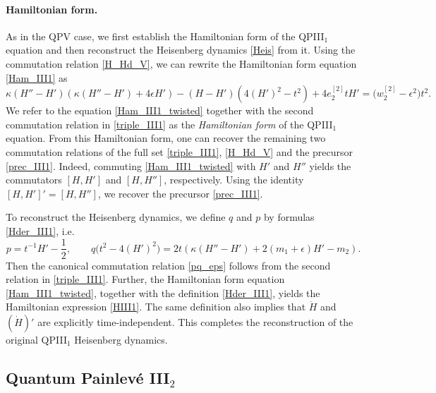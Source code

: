 \documentclass[12pt,a4paper]{article}
\numberwithin{equation}{section}
\begin{document}
\paragraph{Hamiltonian form.}
As in the QPV case, we first establish the Hamiltonian form of the QPIII$_1$ equation and then reconstruct the Heisenberg dynamics \eqref{Heis} from it. Using the commutation relation \eqref{H_Hd_V}, we can rewrite the Hamiltonian form equation \eqref{Ham_III1} as
\begin{equation}
\label{Ham_III1_twisted}
\kappa(H''-H')(\kappa(H''-H')+4\epsilon H')-(H-H')\left(4(H')^2{-}t^2\right)+4e_2^{[2]}tH'=\big(w_2^{[2]}{-}\epsilon^2\big)t^2.
\end{equation}
We refer to the equation \eqref{Ham_III1_twisted} together with the second commutation relation in \eqref{triple_III1} as the \textit{Hamiltonian form} of the QPIII$_1$ equation.
From this Hamiltonian form, one can recover the remaining two commutation relations of the full set \eqref{triple_III1}, \eqref{H_Hd_V} and the precursor \eqref{prec_III1}. Indeed, commuting \eqref{Ham_III1_twisted} with $H'$ and $H''$ yields the commutators $[H,H']$ and $[H,H'']$, respectively. Using the identity $[H,H']'=[H,H'']$, we recover the precursor \eqref{prec_III1}.

To reconstruct the Heisenberg dynamics, we define $q$ and $p$ by formulas \eqref{Hder_III1}, i.e.
\begin{equation}\label{pq_dict_III1}
p=t^{-1}H'-\frac12, \qquad q\big(t^2-4(H')^2\big)=2t\left(\kappa(H''{-}H')+2(m_1{+}\epsilon)H'-m_2\right).
\end{equation}
Then the canonical commutation relation \eqref{pq_eps} follows from the second relation in \eqref{triple_III1}. Further, the Hamiltonian form equation \eqref{Ham_III1_twisted}, together with the definition \eqref{Hder_III1}, yields the Hamiltonian expression \eqref{HIII1}. The same definition also implies that $\dot{H}$ and $(\dot{H})'$ are explicitly time-independent. This completes the reconstruction of the original QPIII$_1$ Heisenberg dynamics.

\subsection{Quantum Painlev\'e III$_2$}
\label{ssec:QPIII2}
\end{document}
